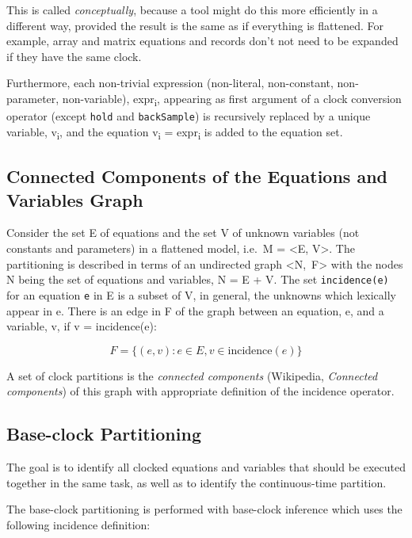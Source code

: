 \begin{nonnormative}
This is called \emph{conceptually}, because a tool might do this more efficiently in a different way, provided the result is the same as if everything is flattened.  For example,
array and matrix equations and records don't not need to be expanded if they have the same clock.
\end{nonnormative}

Furthermore, each non-trivial expression (non-literal, non-constant,
non-parameter, non-variable), expr\textsubscript{i}, appearing as first
argument of a clock conversion operator (except \lstinline!hold! and \lstinline!backSample!)
is recursively replaced by a
unique variable, v\textsubscript{i}, and the equation v\textsubscript{i}
= expr\textsubscript{i} is added to the equation set.

\subsection{Connected Components of the Equations and Variables Graph}\label{connected-components-of-the-equations-and-variables-graph}

Consider the set E of equations and the set V of unknown variables (not
constants and parameters) in a flattened model, i.e.\ M = \textless{}E,
V\textgreater{}. The partitioning is described in terms of an undirected
graph \textless{}N,~F\textgreater{} with the nodes N being the set of
equations and variables, N = E + V. The set \lstinline!incidence(e)! for an equation
\lstinline!e! in E is a subset of V, in general, the unknowns which lexically appear
in e. There is an edge in F of the graph between an equation, e, and a
variable, v, if v = incidence(e):

$$F = \{(e, v) : e \in E , v \in \text{incidence}(e)\}$$

A set of clock partitions is the \emph{connected components} (Wikipedia,
\emph{Connected components}) of this graph with appropriate definition of
the incidence operator.

\subsection{Base-clock Partitioning}\label{base-clock-partitioning}

The goal is to identify all clocked equations and variables that should
be executed together in the same task, as well as to identify the
continuous-time partition.

The base-clock partitioning is performed with base-clock inference which
uses the following incidence definition:

